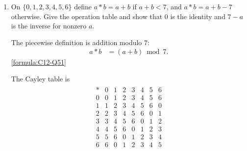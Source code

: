 \begin{enumerate}[label=\thesubsection.\arabic*, ref=\thesubsection.\theenumi]
    The operation is coordinatewise addition, so it is closed on $\mathbb R^2$. Its defining law is
    \begin{align*}
        (a,b)*(c,d) & =(a+c,b+d).
    \end{align*}
    \hfill\eqref{formula:C12-Q50}

    \par
    For associativity,
    \begin{align*}
        ((a,b)*(c,d))*(e,f) & =(a+c+e,b+d+f)
        =(a,b)*((c,d)*(e,f)).
    \end{align*}
    \hfill\eqref{formula:C12-Q50-F01}

    \par
    For commutativity,
    \begin{align*}
        (a,b)*(c,d) & =(a+c,b+d)=(c+a,d+b)=(c,d)*(a,b).
    \end{align*}
    \hfill\eqref{formula:C12-Q50-F02}

    \par
    The identity is $(0,0)$, and the inverse of $(3,-5)$ solves
    \begin{align*}
        (3,-5)*(u,v) & =(3+u,-5+v)=(0,0),
    \end{align*}

    so it is $(-3,5)$. Thus the structure is an Abelian group and
    \begin{align*}
        e & =(0,0),\qquad (3,-5)^{-1}=(-3,5).
    \end{align*}


    \item
    \label{question:C12-Q51}
    \label{question-short:C12-Q51} On $\{0,1,2,3,4,5,6\}$ define $a*b=a+b$ if $a+b<7$, and $a*b=a+b-7$ otherwise. Give the operation table and show that 0 is the identity and $7-a$ is the inverse for nonzero $a$.

    \par
    \smallskip
    \solution

    The piecewise definition is addition modulo $7$:
    \begin{align*}
        a*b & =(a+b)\bmod 7.
    \end{align*}
    \hfill\eqref{formula:C12-Q51}

    \par
    The Cayley table is
    \begin{align*}
        \begin{array}{c|rrrrrrr}* & 0 & 1 & 2 & 3 & 4 & 5 & 6 \\\hline
            0            & 0 & 1 & 2 & 3 & 4 & 5 & 6 \\1&1&2&3&4&5&6&0\\2&2&3&4&5&6&0&1\\3&3&4&5&6&0&1&2\\4&4&5&6&0&1&2&3\\5&5&6&0&1&2&3&4\\6&6&0&1&2&3&4&5
        \end{array}
    \end{align*}


\end{enumerate}
